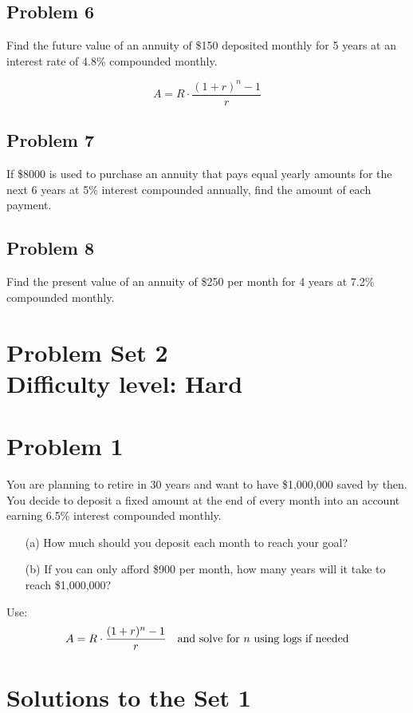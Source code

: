 \documentclass[12pt]{article}
\begin{document}
\subsection*{Problem 6}
Find the future value of an annuity of \$150 deposited monthly for 5 years at an interest rate of 4.8\% compounded monthly.

\[
A = R \cdot \dfrac{(1 + r)^n - 1}{r}
\]

\subsection*{Problem 7}
If \$8000 is used to purchase an annuity that pays equal yearly amounts for the next 6 years at 5\% interest compounded annually, find the amount of each payment.

\subsection*{Problem 8}
Find the present value of an annuity of \$250 per month for 4 years at 7.2\% compounded monthly.

\section*{Problem Set 2\\Difficulty level: Hard}
\section*{Problem 1}
You are planning to retire in 30 years and want to have \$1,000,000 saved by then. You decide to deposit a fixed amount at the end of every month into an account earning 6.5\% interest compounded monthly.

\begin{itemize}
    \item[(a)] How much should you deposit each month to reach your goal?
    \item[(b)] If you can only afford \$900 per month, how many years will it take to reach \$1,000,000?
\end{itemize}

Use:
\[
A = R \cdot \dfrac{(1 + r)^n - 1}{r} \quad \text{and solve for \( n \) using logs if needed}
\]



\newpage
\section*{Solutions to the Set 1}
\end{document}
